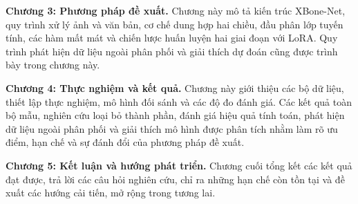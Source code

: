 \textbf{Chương 3: Phương pháp đề xuất.} Chương này mô tả kiến trúc XBone-Net, quy trình xử lý ảnh và văn bản, cơ chế dung hợp hai chiều, đầu phân lớp tuyến tính, các hàm mất mát và chiến lược huấn luyện hai giai đoạn với LoRA. Quy trình phát hiện dữ liệu ngoài phân phối và giải thích dự đoán cũng được trình bày trong chương này.

\textbf{Chương 4: Thực nghiệm và kết quả.} Chương này giới thiệu các bộ dữ liệu, thiết lập thực nghiệm, mô hình đối sánh và các độ đo đánh giá. Các kết quả toàn bộ mẫu, nghiên cứu loại bỏ thành phần, đánh giá hiệu quả tính toán, phát hiện dữ liệu ngoài phân phối và giải thích mô hình được phân tích nhằm làm rõ ưu điểm, hạn chế và sự đánh đổi của phương pháp đề xuất.

\textbf{Chương 5: Kết luận và hướng phát triển.} Chương cuối tổng kết các kết quả đạt được, trả lời các câu hỏi nghiên cứu, chỉ ra những hạn chế còn tồn tại và đề xuất các hướng cải tiến, mở rộng trong tương lai.

